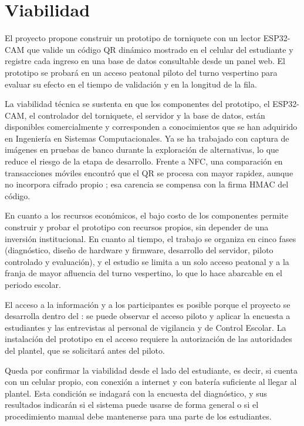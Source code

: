\ifdefined\justsec{}\else\section{Viabilidad}\fi
El proyecto propone construir un prototipo de torniquete con un lector
ESP32-CAM que valide un código QR dinámico mostrado en el celular del
estudiante y registre cada ingreso en una base de datos consultable desde
un panel web. El prototipo se probará en un acceso peatonal piloto del
turno vespertino para evaluar su efecto en el tiempo de validación y en la
longitud de la fila.

La viabilidad técnica se sustenta en que los componentes del prototipo, el
ESP32-CAM, el controlador del torniquete, el servidor y la base de datos,
están disponibles comercialmente y corresponden a conocimientos que se han
adquirido en Ingeniería en Sistemas Computacionales. Ya se ha trabajado con
captura de imágenes en pruebas de banco durante la exploración de
alternativas, lo que reduce el riesgo de la etapa de desarrollo. Frente a
NFC, una comparación en transacciones móviles encontró que el QR se procesa
con mayor rapidez, aunque no incorpora cifrado propio
\parencite{harnaningrum2024comparison}; esa carencia se compensa con la firma
HMAC del código.

En cuanto a los recursos económicos, el bajo costo de los componentes
permite construir y probar el prototipo con recursos propios, sin depender
de una inversión institucional. En cuanto al tiempo, el trabajo se organiza
en cinco fases (diagnóstico, diseño de hardware y firmware, desarrollo del
servidor, piloto controlado y evaluación), y el estudio se limita a un solo
acceso peatonal y a la franja de mayor afluencia del turno vespertino, lo
que lo hace abarcable en el periodo escolar.

El acceso a la información y a los participantes es posible porque el
proyecto se desarrolla dentro del \tescha{}: se puede observar el acceso
piloto y aplicar la encuesta a estudiantes y las entrevistas al personal de
vigilancia y de Control Escolar. La instalación del prototipo en el acceso
requiere la autorización de las autoridades del plantel, que se solicitará
antes del piloto.

Queda por confirmar la viabilidad desde el lado del estudiante, es decir, si
cuenta con un celular propio, con conexión a internet y con batería
suficiente al llegar al plantel. Esta condición se indagará con la encuesta
del diagnóstico, y sus resultados indicarán si el sistema puede usarse de
forma general o si el procedimiento manual debe mantenerse para una parte de
los estudiantes.
